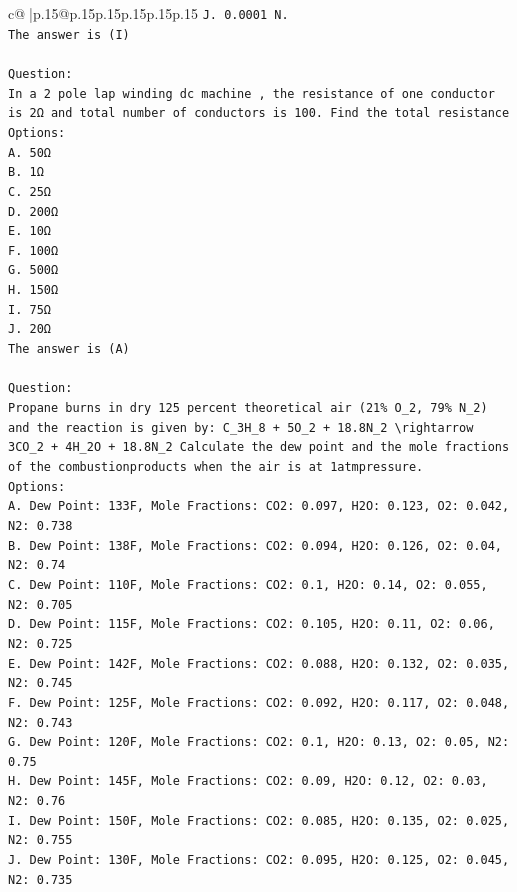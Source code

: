 \documentclass{article}
\begin{document}
{\begin{supertabular}{c@{$\;$}|p{.15\linewidth}@{}p{.15\linewidth}p{.15\linewidth}p{.15\linewidth}p{.15\linewidth}p{.15\linewidth}}
{{{\texttt{J. 0.0001 N.} \\
\texttt{The answer is (I)} \\
\\ 
\texttt{Question:} \\
\texttt{In a 2 pole lap winding dc machine , the resistance of one conductor is 2Ω and total number of conductors is 100. Find the total resistance} \\
\texttt{Options:} \\
\texttt{A. 50Ω} \\
\texttt{B. 1Ω} \\
\texttt{C. 25Ω} \\
\texttt{D. 200Ω} \\
\texttt{E. 10Ω} \\
\texttt{F. 100Ω} \\
\texttt{G. 500Ω} \\
\texttt{H. 150Ω} \\
\texttt{I. 75Ω} \\
\texttt{J. 20Ω} \\
\texttt{The answer is (A)} \\
\\ 
\texttt{Question:} \\
\texttt{Propane burns in dry 125 percent theoretical air (21\% O\_2, 79\% N\_2) and the reaction is given by: C\_3H\_8 + 5O\_2 + 18.8N\_2 \textbackslash{}rightarrow 3CO\_2 + 4H\_2O + 18.8N\_2 Calculate the dew point and the mole fractions of the combustionproducts when the air is at 1atmpressure.} \\
\texttt{Options:} \\
\texttt{A. Dew Point: 133F, Mole Fractions: CO2: 0.097, H2O: 0.123, O2: 0.042, N2: 0.738} \\
\texttt{B. Dew Point: 138F, Mole Fractions: CO2: 0.094, H2O: 0.126, O2: 0.04, N2: 0.74} \\
\texttt{C. Dew Point: 110F, Mole Fractions: CO2: 0.1, H2O: 0.14, O2: 0.055, N2: 0.705} \\
\texttt{D. Dew Point: 115F, Mole Fractions: CO2: 0.105, H2O: 0.11, O2: 0.06, N2: 0.725} \\
\texttt{E. Dew Point: 142F, Mole Fractions: CO2: 0.088, H2O: 0.132, O2: 0.035, N2: 0.745} \\
\texttt{F. Dew Point: 125F, Mole Fractions: CO2: 0.092, H2O: 0.117, O2: 0.048, N2: 0.743} \\
\texttt{G. Dew Point: 120F, Mole Fractions: CO2: 0.1, H2O: 0.13, O2: 0.05, N2: 0.75} \\
\texttt{H. Dew Point: 145F, Mole Fractions: CO2: 0.09, H2O: 0.12, O2: 0.03, N2: 0.76} \\
\texttt{I. Dew Point: 150F, Mole Fractions: CO2: 0.085, H2O: 0.135, O2: 0.025, N2: 0.755} \\
\texttt{J. Dew Point: 130F, Mole Fractions: CO2: 0.095, H2O: 0.125, O2: 0.045, N2: 0.735} \\
            }
        }
    }
     \\ \\


\end{supertabular}}
\end{document}
